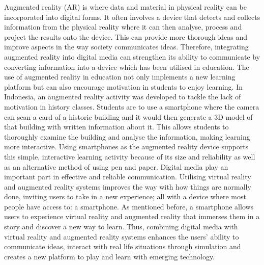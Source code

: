 \documentclass[12pt, times new roman]{article}
\begin{document}
\newline Augmented reality (AR) is where data and material in physical reality can be incorporated into digital forms. It often involves a device that detects and collects information from the physical reality where it can then analyse, process and project the results onto the device. This can provide more thorough ideas and improve aspects in the way society communicates ideas. Therefore, integrating augmented reality into digital media can strengthen its ability to communicate by converting information into a device which has been utilised in education.
\newline The use of augmented reality in education not only implements a new learning platform but can also encourage motivation in students to enjoy learning. In Indonesia, an augmented reality activity was developed to tackle the lack of motivation in history classes. Students are to use a smartphone where the camera can scan a card of a historic building and it would then generate a 3D model of that building with written information about it. This allows students to thoroughly examine the building and analyse the information, making learning more interactive. Using smartphones as the augmented reality device supports this simple, interactive learning activity because of its size and reliability as well as an alternative method of using pen and paper. 
\newline Digital media play an important part in effective and reliable communication. Utilising virtual reality and augmented reality systems improves the way with how things are normally done, inviting users to take in a new experience; all with a device where most people have access to: a smartphone. As mentioned before, a smartphone allows users to experience virtual reality and augmented reality that immerses them in a story and discover a new way to learn. Thus, combining digital media with virtual reality and augmented reality systems enhances the users’ ability to communicate ideas, interact with real life situations through simulation and creates a new platform to play and learn with emerging technology.
\end{document}
